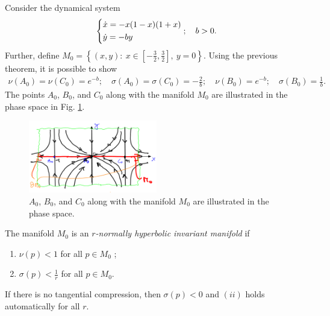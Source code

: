 \begin{ex}[]
	Consider the dynamical system
	\begin{align}
		\begin{dcases}
			\dot{x} = -x(1-x)(1+x) \\
			\dot{y} = -by
		\end{dcases}
		;\quad b>0.
	\end{align}
	Further, define $M_0 = \left\{ (x,y):\ x\in \left[ -\frac{3}{2}, \frac{3}{2}\right],\ y=0 \right\}$. Using the previous theorem, it is possible to show
	\begin{align}
		\nu (A_0) = \nu (C_0) = e^{-b}; \quad \sigma(A_0) = \sigma(C_0) = - \frac{2}{b}; \quad
		\nu (B_0) = e^{-b}; \quad \sigma(B_0) = \frac{1}{b}.
	\end{align}
	The points $A_0$, $B_0$, and $C_0$ along with the manifold $M_0$ are illustrated in the phase space in Fig. \ref{fig:fenichel_ex1}.
	\begin{figure}[h!]
		\centering
		\includegraphics[width=0.5\textwidth]{figures/ch9/14fenichel_ex1.png}
		\caption{$A_0$, $B_0$, and $C_0$ along with the manifold $M_0$ are illustrated in the phase space.}
		\label{fig:fenichel_ex1}
	\end{figure}
\end{ex}

\begin{definition}
	The manifold $M_0$ is an \emph{$r$-normally hyperbolic invariant manifold} if
	\begin{enumerate}
		\item $\nu (p)<1$ for all $p\in M_0$ ;
		\item $\sigma(p) < \frac{1}{r}$ for all $p \in M_0$.
	\end{enumerate}	
\end{definition}
\begin{remark}[]
	If there is no tangential compression, then $\sigma(p)<0$ and $(ii)$ holds automatically for all $r$.
\end{remark}

